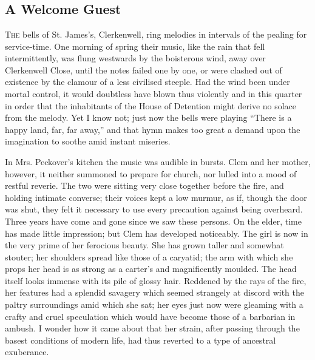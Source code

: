 \part{}

\chapter{A Welcome Guest}

\textsc{The} bells of St. James's, Clerkenwell, ring melodies in
intervals of the pealing for service-time. One morning of spring their
music, like the rain that fell intermittently, was flung westwards by
the boisterous wind, away over Clerkenwell Close, until the notes failed
one by one, or were clashed out of existence by the clamour of a less
civilised steeple. Had the wind been under mortal control, it would
doubtless have blown thus violently and in this quarter in order that
the inhabitants of the House of Detention might derive no solace from
the melody. Yet I know not; just now the bells were
{\protect\hypertarget{2}{}{}}playing ``There is a happy land, far, far
away,'' and that hymn makes too great a demand upon the imagination to
soothe amid instant miseries.

In Mrs. Peckover's kitchen the music was audible in bursts. Clem and her
mother, however, it neither summoned to prepare for church, nor lulled
into a mood of restful reverie. The two were sitting very close together
before the fire, and holding intimate converse; their voices kept a low
murmur, as if, though the door was shut, they felt it necessary to use
every precaution against being overheard. Three years have come and gone
since we saw these persons. On the elder, time has made little
impression; but Clem has developed noticeably. The girl is now in the
very prime of her ferocious beauty. She has grown taller and somewhat
stouter; her shoulders spread like those of a caryatid; the arm with
which she props her head is as strong as a carter's and magnificently
moulded. The head itself looks immense with its pile of glossy hair.
{\protect\hypertarget{3}{}{}}Reddened by the rays of the fire, her
features had a splendid savagery which seemed strangely at discord with
the paltry surroundings amid which she sat; her eyes just now were
gleaming with a crafty and cruel speculation which would have become
those of a barbarian in ambush. I wonder how it came about that her
strain, after passing through the basest conditions of modern life, had
thus reverted to a type of ancestral exuberance.

